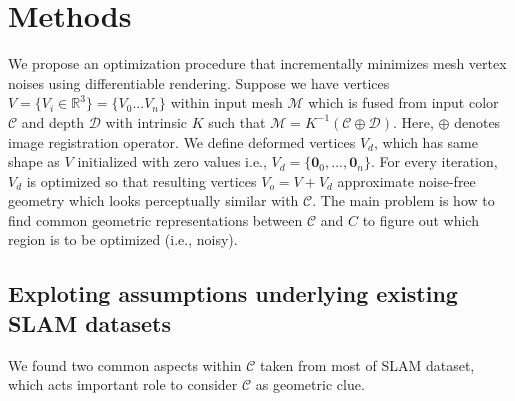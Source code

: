 \section{Methods}

We propose an optimization procedure that incrementally minimizes mesh vertex noises using differentiable rendering. 
Suppose we have vertices $V=\{V_i\in\mathbb{R}^3\}=\{V_0...V_n\}$ within input mesh $\mathcal{M}$ which is fused from input color $\mathcal{C}$ and depth $\mathcal{D}$ with intrinsic $K$ such that $\mathcal{M}=K^{-1}\left(\mathcal{C}\oplus \mathcal{D}\right)$. 
Here, $\oplus$ denotes image registration operator.
We define deformed vertices $V_d$, which has same shape as $V$ initialized with zero values i.e., $V_d=\{\mathbf{0}_0,...,\mathbf{0}_n\}$. 
For every iteration, $V_d$ is optimized so that resulting vertices $V_o=V+V_d$ approximate noise-free geometry which looks perceptually similar with $\mathcal{C}$. 
The main problem is how to find common geometric representations between $\mathcal{C}$ and $C$ to figure out which region is to be optimized (i.e., noisy).


\subsection{Exploting assumptions underlying existing SLAM datasets}
We found two common aspects within $\mathcal{C}$ taken from most of SLAM dataset, which acts important role to consider $\mathcal{C}$ as geometric clue.

